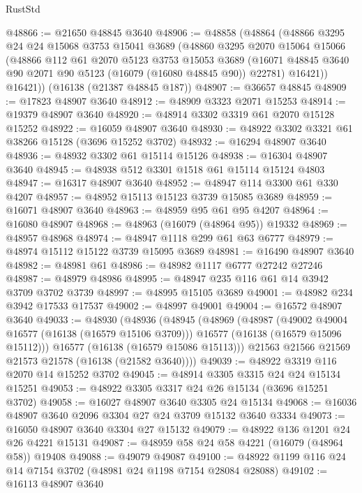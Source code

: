 \begin{lexlean}{RustStd}
\begin{coremodule}
@48866 := @21650 @48845 @3640
@48906 := @48858
    (@48864
      (@48866
        @3295
        @24
        @24
        @15068
        @3753
        @15041
        @3689
        (@48860
          @3295
          @2070
          @15064
          @15066
          (@48866
            @112
            @61
            @2070
            @5123
            @3753
            @15053
            @3689
            (@16071 @48845 @3640 @90 @2071 @90 @5123 (@16079 (@16080 @48845 @90)) @22781)
            @16421))
        @16421))
    (@16138 (@21387 @48845 @187))
@48907 := @36657 @48845
@48909 := @17823 @48907 @3640
@48912 := @48909 @3323 @2071 @15253
@48914 := @19379 @48907 @3640
@48920 := @48914 @3302 @3319 @61 @2070 @15128 @15252
@48922 := @16059 @48907 @3640
@48930 := @48922 @3302 @3321 @61 @38266 @15128 (@3696 @15252 @3702)
@48932 := @16294 @48907 @3640
@48936 := @48932 @3302 @61 @15114 @15126
@48938 := @16304 @48907 @3640
@48945 := @48938 @512 @3301 @1518 @61 @15114 @15124 @4803
@48947 := @16317 @48907 @3640
@48952 := @48947 @114 @3300 @61 @330 @4207
@48957 := @48952 @15113 @15123 @3739 @15085 @3689
@48959 := @16071 @48907 @3640
@48963 := @48959 @95 @61 @95 @4207
@48964 := @16080 @48907
@48968 := @48963 (@16079 (@48964 @95)) @19332
@48969 := @48957 @48968
@48974 := @48947 @1118 @299 @61 @63 @6777
@48979 := @48974 @15112 @15122 @3739 @15095 @3689
@48981 := @16490 @48907 @3640
@48982 := @48981 @61
@48986 := @48982 @1117 @6777 @27242 @27246
@48987 := @48979 @48986
@48995 := @48947 @235 @116 @61 @14 @3942 @3709 @3702 @3739
@48997 := @48995 @15105 @3689
@49001 := @48982 @234 @3942 @17533 @17537
@49002 := @48997 @49001
@49004 := @16572 @48907 @3640
@49033 := @48930
    (@48936
      (@48945
        (@48969
          (@48987
            (@49002 @49004 @16577 (@16138 (@16579 @15106 @3709)))
            @16577
            (@16138 (@16579 @15096 @15112)))
          @16577
          (@16138 (@16579 @15086 @15113)))
        @21563
        @21566
        @21569
        @21573
        @21578
        (@16138 (@21582 @3640))))
@49039 := @48922 @3319 @116 @2070 @14 @15252 @3702
@49045 := @48914 @3305 @3315 @24 @24 @15134 @15251
@49053 := @48922 @3305 @3317 @24 @26 @15134 (@3696 @15251 @3702)
@49058 := @16027 @48907 @3640 @3305 @24 @15134
@49068 := @16036 @48907 @3640 @2096 @3304 @27 @24 @3709 @15132 @3640 @3334
@49073 := @16050 @48907 @3640 @3304 @27 @15132
@49079 := @48922 @136 @1201 @24 @26 @4221 @15131
@49087 := @48959 @58 @24 @58 @4221 (@16079 (@48964 @58)) @19408
@49088 := @49079 @49087
@49100 := @48922 @1199 @116 @24 @14 @7154 @3702 (@48981 @24 @1198 @7154 @28084 @28088)
@49102 := @16113 @48907 @3640

\end{coremodule}
\end{lexlean}
